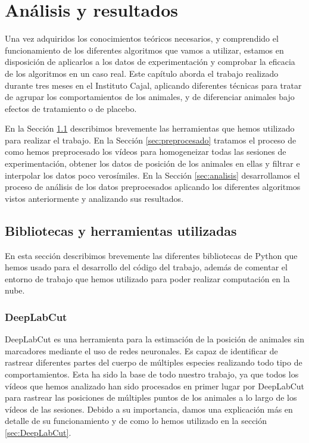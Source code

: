 \chapter{Análisis y resultados}
\label{chap:analisis-y-resultados}

Una vez adquiridos los conocimientos teóricos necesarios, y comprendido el funcionamiento de los diferentes algoritmos que vamos a utilizar, estamos en disposición de aplicarlos a los datos de experimentación y comprobar la eficacia de los algoritmos en un caso real. Este capítulo aborda el trabajo realizado durante tres meses en el Instituto Cajal, aplicando diferentes técnicas para tratar de agrupar los comportamientos de los animales, y de diferenciar animales bajo efectos de tratamiento o de placebo.

En la Sección \ref{sec:herramientas} describimos brevemente las herramientas que hemos utilizado para realizar el trabajo. En la Sección \ref{sec:preprocesado} tratamos el proceso de como hemos preprocesado los vídeos para homogeneizar todas las sesiones de experimentación, obtener los datos de posición de los animales en ellas y filtrar e interpolar los datos poco verosímiles. En la Sección \ref{sec:analisis} desarrollamos el proceso de análisis de los datos preprocesados aplicando los diferentes algoritmos vistos anteriormente y analizando sus resultados.

\section{Bibliotecas y herramientas utilizadas} \label{sec:herramientas}
En esta sección describimos brevemente las diferentes bibliotecas de Python que hemos usado para el desarrollo del código del trabajo, además de comentar el entorno de trabajo que hemos utilizado para poder realizar computación en la nube.
\subsection*{DeepLabCut}
DeepLabCut \cite{deeplabcut} es una herramienta para la estimación de la posición de animales sin marcadores mediante el uso de redes neuronales. Es capaz de identificar de rastrear diferentes partes del cuerpo de múltiples especies realizando todo tipo de comportamientos. Esta ha sido la base de todo nuestro trabajo, ya que todos los vídeos que hemos analizado han sido procesados en primer lugar por DeepLabCut para rastrear las posiciones de múltiples puntos de los animales a lo largo de los vídeos de las sesiones. Debido a su importancia, damos una explicación más en detalle de su funcionamiento y de como lo hemos utilizado en la sección \ref{sec:DeepLabCut}.

